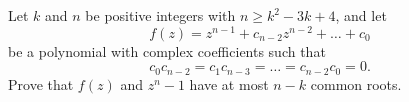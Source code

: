 \documentclass{article}
\begin{document}
\setlength{\parindent}{0pt}
Let $k$ and $n$ be positive integers with $n\ge k^2-3k+4$, and let$$ f(z)=z^{n-1}+c_{n-2}z^{n-2}+\ldots+c_0 $$be a polynomial with complex coefficients such that$$c_0c_{n-2}=c_1c_{n-3}=\ldots=c_{n-2}c_0=0.$$Prove that $f(z)$ and $z^n-1$ have at most $n-k$ common roots.
\end{document}
